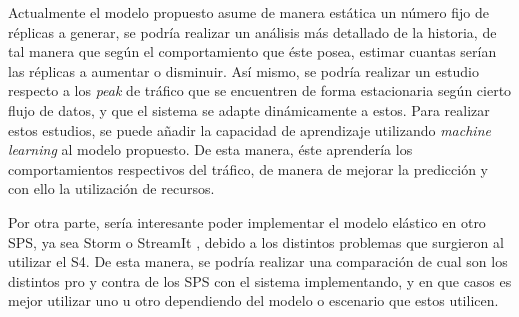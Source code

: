 Actualmente el modelo propuesto asume de manera estática un número fijo de réplicas a generar, se podría realizar un análisis más detallado de la historia, de tal manera que según el comportamiento que éste posea, estimar cuantas serían las réplicas a aumentar o disminuir. Así mismo, se podría realizar un estudio respecto a los \textit{peak} de tráfico que se encuentren de forma estacionaria según cierto flujo de datos, y que el sistema se adapte dinámicamente a estos. Para realizar estos estudios, se puede añadir la capacidad de aprendizaje utilizando \textit{machine learning} \citep{bookMohri2012} al modelo propuesto. De esta manera, éste aprendería los comportamientos respectivos del tráfico, de manera de mejorar la predicción y con ello la utilización de recursos.


Por otra parte, sería interesante poder implementar el modelo elástico en otro SPS, ya sea Storm \citep{stormtwitter} o StreamIt \citep{ThiesKA02}, debido a los distintos problemas que surgieron al utilizar el S4. De esta manera, se podría realizar una comparación de cual son los distintos pro y contra de los SPS con el sistema implementando, y en que casos es mejor utilizar uno u otro dependiendo del modelo o escenario que estos utilicen.